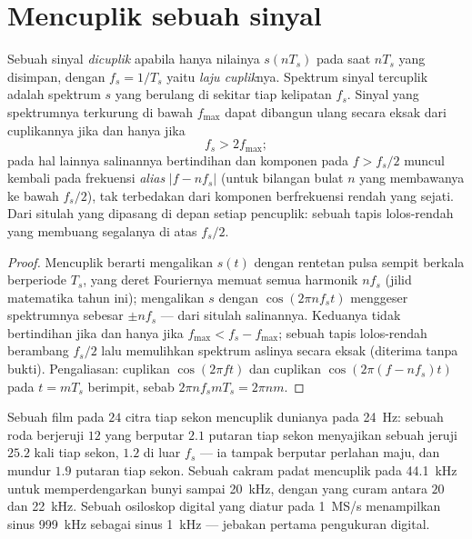 \section{Mencuplik sebuah sinyal}

\begin{theorem}\label{thm:b2:feedback-oscillators:shannon}
Sebuah sinyal \emph{dicuplik} apabila hanya nilainya $s(nT_s)$ pada
saat $nT_s$ yang disimpan, dengan $f_s = 1/T_s$ yaitu \emph{laju cuplik}nya.
Spektrum sinyal tercuplik adalah spektrum $s$ yang berulang
di sekitar tiap kelipatan $f_s$. Sinyal yang spektrumnya terkurung
di bawah $f_{\max}$ dapat dibangun ulang secara eksak dari cuplikannya jika dan
hanya jika
\[
f_s > 2f_{\max} ;
\]
pada hal lainnya salinannya bertindihan dan komponen pada $f > f_s/2$ muncul kembali
pada frekuensi \emph{alias} $|f - nf_s|$ (untuk bilangan bulat $n$ yang
membawanya ke bawah $f_s/2$), tak terbedakan dari komponen berfrekuensi rendah
yang sejati. Dari situlah \emph{} yang dipasang di depan setiap
pencuplik: sebuah tapis lolos-rendah yang membuang segalanya di atas $f_s/2$.
\end{theorem}

\begin{proof}
Mencuplik berarti mengalikan $s(t)$ dengan rentetan pulsa sempit berkala
berperiode $T_s$, yang deret Fouriernya memuat semua harmonik $nf_s$
(jilid matematika tahun ini); mengalikan $s$ dengan $\cos(2\pi nf_st)$
menggeser spektrumnya sebesar $\pm nf_s$ --- dari situlah salinannya. Keduanya tidak
bertindihan jika dan hanya jika $f_{\max} < f_s - f_{\max}$; sebuah tapis lolos-rendah berambang $f_s/2$ lalu
memulihkan spektrum aslinya secara eksak (diterima tanpa bukti). Pengaliasan: cuplikan
$\cos(2\pi ft)$ dan cuplikan $\cos(2\pi(f - nf_s)t)$ pada $t = mT_s$
berimpit, sebab $2\pi nf_smT_s = 2\pi nm$.
\end{proof}

\begin{example}\label{ex:b2:feedback-oscillators:alias}
Sebuah film pada $24$ citra tiap sekon mencuplik dunianya pada \qty{24}{Hz}: sebuah
roda berjeruji $12$ yang berputar $2.1$ putaran tiap sekon menyajikan sebuah jeruji
$25.2$ kali tiap sekon, $1.2$ di luar $f_s$ --- ia tampak berputar perlahan
maju, dan mundur $1.9$ putaran tiap sekon. Sebuah cakram padat mencuplik
pada \qty{44.1}{kHz} untuk memperdengarkan bunyi sampai \qty{20}{kHz}, dengan
 yang curam antara $20$ dan \qty{22}{kHz}. Sebuah osiloskop digital
yang diatur pada \qty{1}{MS/s} menampilkan sinus \qty{999}{kHz} sebagai sinus \qty{1}{kHz} ---
jebakan pertama pengukuran digital.
\end{example}

